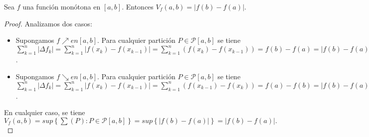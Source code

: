 \begin{lemma}

Sea $f$ una función monótona en $ \left[ a,b \right] $. Entonces $V_f \left( a,b \right) = |f\left(b\right)-f\left(a\right)|$.

\end{lemma}

\begin{proof}

Analizamos dos casos:
\begin{itemize}
  
  \item[\tiny{\ding{110}}] Supongamos $f \nearrow en \left[ a,b \right]$. Para cualquier partición $P \in \mathcal{P} \left[ a,b \right]$ se tiene $\sum_{k=1}^{n} |\Delta f_k|= \sum_{k=1}^{n} |f\left(x_k\right)-f\left( x_{k-1}\right)| = \sum_{k=1}^{n} \left(f\left(x_k \right)-f\left(x_{k-1} \right)\right)=f \left(b \right)-f\left(a \right)=|f\left(b \right)-f\left(a \right)|$.\\

  \item[\tiny{\ding{110}}] Supongamos $f \searrow en \left[ a,b \right]$. Para cualquier partición $P \in \mathcal{P} \left[ a,b \right]$ se tiene $\sum_{k=1}^{n} |\Delta f_k|= \sum_{k=1}^{n} |f\left(x_k\right)-f\left( x_{k-1}\right)| = \sum_{k=1}^{n} \left(f\left(x_{k-1} \right)-f\left(x_{k} \right)\right)=f \left(a \right)-f\left(b \right)=|f\left(b \right)-f\left(a \right)|$.\\
  
\end{itemize}

En cualquier caso, se tiene $V_f \left(a,b\right)=sup\left\lbrace\sum \left(P\right):P\in \mathcal{P} \left[a,b\right]\right\rbrace=sup\left\lbrace|f\left(b\right)-f\left(a\right)|\right\rbrace=|f\left(b\right)-f\left(a\right)|.$ 

\end{proof}

